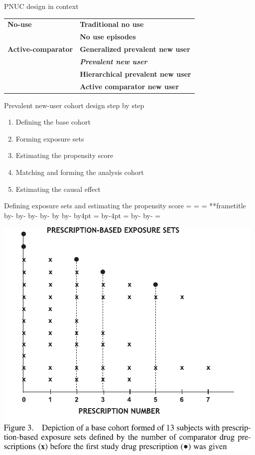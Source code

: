 \documentclass[aspectratio=169,12pt]{beamer} %
\makeatletter
\newif\ifsidebartheme
\newcommand*{\calculatespace}{%
    \contentheight=\paperheight%
    \ifx\beamer@frametitle\@empty%
        \setbox\@tempboxa=\box\voidb@x%
      \else%
        \setbox\@tempboxa=\vbox{%
          \vbox{}%
          {\parskip0pt\usebeamertemplate***{frametitle}}%
        }%
        \ifsidebartheme%
          \advance\contentheight by-1em%
        \fi%
      \fi%
    \advance\contentheight by-\ht\@tempboxa%
    \advance\contentheight by-\dp\@tempboxa%
    \advance\contentheight by-\beamer@frametopskip%
    \ifbeamer@plainframe%
    \contentbottom=0pt%
    \else%
    \advance\contentheight by-\headheight%
    \advance\contentheight by\headdp%
    \advance\contentheight by-\footheight%
    \advance\contentheight by4pt%
    \contentbottom=\footheight%
    \advance\contentbottom by-4pt%
    \fi%
    \contentwidth=\paperwidth%
    \ifbeamer@plainframe%
    \contentleft=0pt%
    \else%
    \advance\contentwidth by-\beamer@rightsidebar%
    \advance\contentwidth by-\beamer@leftsidebar\relax%
    \contentleft=\beamer@leftsidebar%
    \fi%
}
\makeatother
\begin{document}
\begin{frame}{PNUC design in context}
	\centering
	\begin{tabular}{ll}
	\hline
		\bf{No-use} & \bf{Traditional no use} \\
		& \bf{No use episodes} \\
	\hline
		\bf{Active-comparator}  & \bf{Generalized prevalent new user} \\
		& \emph{\bf{Prevalent new user}} \\
		& \bf{Hierarchical prevalent new user} \\
		& \bf{Active comparator new user} \\
	\hline
	\end{tabular}
\end{frame}

\begin{frame}{Prevalent new-user cohort design step by step}
    \begin{enumerate}
	\item Defining the base cohort
	\item Forming exposure sets
	\item Estimating the propensity score
	\item Matching and forming the analysis cohort
	\item Estimating the causal effect
    \end{enumerate}
\end{frame}

\begin{frame}{Defining exposure sets and estimating the propensity score}
    \calculatespace%
    \begin{center}
	\includegraphics[height=0.85\contentheight]{ref/suimoodell-fig3.pdf}
    \end{center}

\end{frame}
\end{document}
